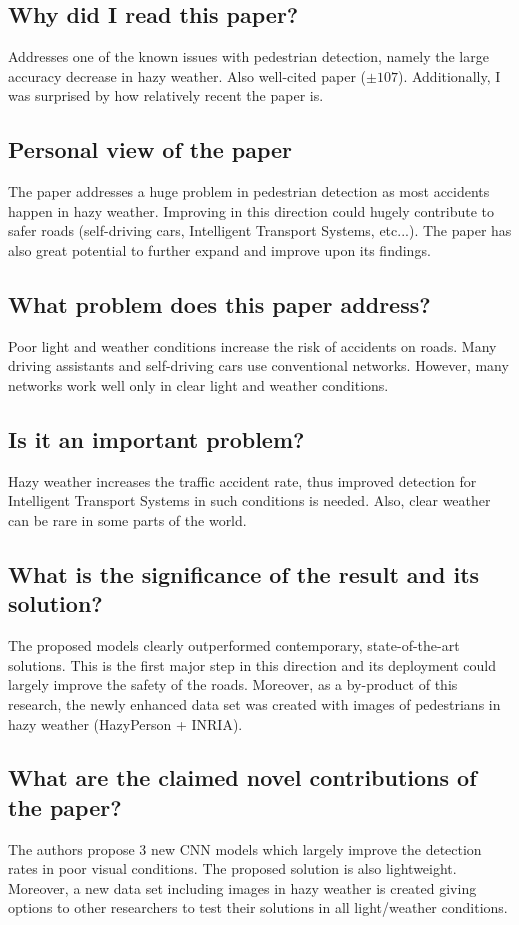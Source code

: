 \documentclass[11pt,a4paper]{article}
\begin{document}
\subsection*{Why did I read this paper?}
Addresses one of the known issues with pedestrian detection, namely the large accuracy decrease in hazy weather. Also well-cited paper ($\pm107$). Additionally, I was surprised by how relatively recent the paper is.

\subsection*{Personal view of the paper}
The paper addresses a huge problem in pedestrian detection as most accidents happen in hazy weather. Improving in this direction could hugely contribute to safer roads (self-driving cars, Intelligent Transport Systems, etc...). The paper has also great potential to further expand and improve upon its findings.

\subsection*{What problem does this paper address?}
Poor light and weather conditions increase the risk of accidents on roads. Many driving assistants and self-driving cars use conventional networks. However, many networks work well only in clear light and weather conditions.

\subsection*{Is it an important problem?}
Hazy weather increases the traffic accident rate, thus improved detection for Intelligent Transport Systems in such conditions is needed. Also, clear weather can be rare in some parts of the world.

\subsection*{What is the significance of the result and its solution?}
The proposed models clearly outperformed contemporary, state-of-the-art solutions. This is the first major step in this direction and its deployment could largely improve the safety of the roads. Moreover, as a by-product of this research, the newly enhanced data set was created with images of pedestrians in hazy weather (HazyPerson + INRIA).

\subsection*{What are the claimed novel contributions of the paper?}
The authors propose 3 new CNN models which largely improve the detection rates in poor visual conditions. The proposed solution is also lightweight. Moreover, a new data set including images in hazy weather is created giving options to other researchers to test their solutions in all light/weather conditions.
\end{document}
